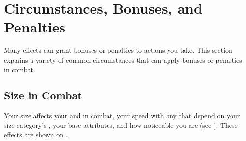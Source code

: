 \section{Circumstances, Bonuses, and Penalties}
    Many effects can grant bonuses or penalties to actions you take.
    This section explains a variety of common circumstances that can apply bonuses or penalties in combat.

    \subsection{Size in Combat}\label{Size in Combat}
        Your size affects your  and  in combat, your speed with any  that depend on your size category's , your base attributes, and how noticeable you are (see ).
        These effects are shown on .

